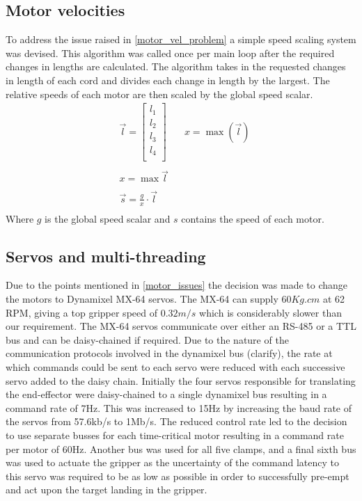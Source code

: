 \documentclass[conference]{IEEEtran}
\begin{document}
		\subsection{Motor velocities}\label{motor_speed_section}
		To address the issue raised in \ref{motor_vel_problem} a simple speed scaling system was devised. This algorithm was called once per main loop after the required changes in lengths are calculated. The algorithm takes in the requested changes in length of each cord and divides each change in length by the largest. The relative speeds of each motor are then scaled by the global speed scalar.
		\begin{equation}\label{motor_speed_equation}
		\begin{aligned}
		&\vec{l} = \begin{bmatrix}
		l_1\\l_2\\l_3\\l_4\\
		\end{bmatrix}\quad
		&x = \max\left(\vec{l}\right)\\\\
		&x = \max\vec{l}\\\\
		&\vec{s} = \frac{g}{x}\cdot \vec{l}\\
		\end{aligned}
		\end{equation}
		Where $g$ is the global speed scalar and $s$ contains the speed of each motor. 
		\subsection{Servos and multi-threading}
		Due to the points mentioned in \ref{motor_issues} the decision was made to change the motors to Dynamixel MX-64 servos. The MX-64 can supply $60Kg.cm$ at 62 RPM, giving a top gripper speed of $0.32m/s$ which is considerably slower than our requirement. The MX-64 servos communicate over either an RS-485 or a TTL bus and can be daisy-chained if required. Due to the nature of the communication protocols involved in the dynamixel bus (clarify), the rate at which commands could be sent to each servo were reduced with each successive servo added to the daisy chain. Initially the four servos responsible for translating the end-effector were daisy-chained to a single dynamixel bus resulting in a command rate of 7Hz. This was increased to 15Hz by increasing the baud rate of the servos from 57.6kb/s to 1Mb/s. The reduced control rate led to the decision to use separate busses for each time-critical motor resulting in a command rate per motor of 60Hz. Another bus was used for all five clamps, and a final sixth bus was used to actuate the gripper as the uncertainty of the command latency to this servo was required to be as low as possible in order to successfully pre-empt and act upon the target landing in the gripper. 
		
\end{document}
